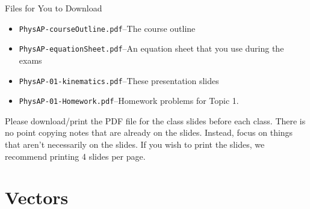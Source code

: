 \documentclass[12pt,compress,aspectratio=169]{beamer}
\begin{document}
\begin{frame}
  \titlepage
\end{frame}

\begin{frame}{Files for You to Download}
  \begin{itemize}
  \item\texttt{PhysAP-courseOutline.pdf}--The course outline
  \item\texttt{PhysAP-equationSheet.pdf}--An equation sheet that you use during
    the exams
  \item\texttt{PhysAP-01-kinematics.pdf}--These presentation slides
  \item\texttt{PhysAP-01-Homework.pdf}--Homework problems for Topic 1.
  \end{itemize}
  
  \vspace{.1in}Please download/print the PDF file for the class slides before
  each class. There is no point copying notes that are already on the slides.
  Instead, focus on things that aren't necessarily on the slides. If you wish
  to print the slides, we recommend printing 4 slides per page.
\end{frame}



\section{Vectors}
\end{document}
